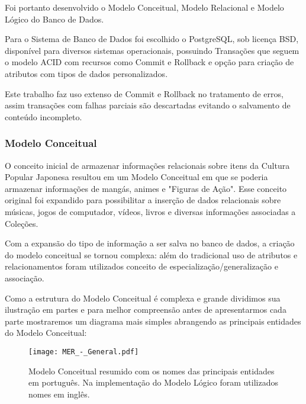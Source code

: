 \documentclass[12pt]{article}
\begin{document}
Foi portanto desenvolvido o Modelo Conceitual, Modelo Relacional e Modelo Lógico do Banco de Dados.

Para o Sistema de Banco de Dados foi escolhido o PostgreSQL, sob licença BSD, disponível para diversos sistemas operacionais, possuindo Transações que seguem o modelo ACID com recursos como Commit e Rollback e opção para criação de atributos com tipos de dados personalizados. 

Este trabalho faz uso extenso de Commit e Rollback no tratamento de erros, assim transações com falhas parciais são descartadas evitando o salvamento de conteúdo incompleto.


\subsubsection{Modelo Conceitual}

O conceito inicial de armazenar informações relacionais sobre itens da Cultura Popular Japonesa resultou em um Modelo Conceitual em que se poderia armazenar informações de mangás, animes e "Figuras de Ação". Esse conceito original foi expandido para possibilitar a inserção de dados relacionais sobre músicas, jogos de computador, vídeos, livros e diversas informações associadas a Coleções. 

Com a expansão do tipo de informação a ser salva no banco de dados, a criação do modelo conceitual se tornou complexa: além do tradicional uso de atributos e relacionamentos foram utilizados conceito de especialização/generalização e associação. 

Como a estrutura do Modelo Conceitual é complexa e grande dividimos sua ilustração em partes e para melhor compreensão antes de apresentarmos cada parte mostraremos um diagrama mais simples abrangendo as principais entidades do Modelo Conceitual:

\begin{figure}[H]
\centering
\texttt{[image: MER\_-\_General.pdf]}
\caption{Modelo Conceitual resumido com os nomes das principais entidades em português. Na implementação do Modelo Lógico foram utilizados nomes em inglês.} \label{hash}
\end{figure}
\end{document}

